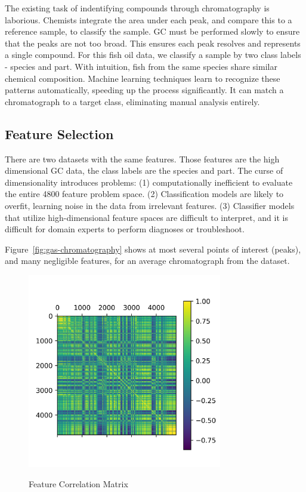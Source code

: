 \documentclass[runningheads]{llncs}
\begin{document}
The existing task \cite{eder1995gas,restek2018high} of indentifying compounds through chromatography is laborious.
Chemists integrate the area under each peak, and compare this to a reference sample, to classify the sample.
GC must be performed slowly to ensure that the peaks are not too broad.
This ensures each peak resolves and represents a single compound.
For this fish oil data, we classify a sample by two class labels - species and part. 
With intuition, fish from the same species share similar chemical composition.
Machine learning techniques learn to recognize these patterns automatically, speeding up the process significantly. 
It can match a chromatograph to a target class, eliminating manual analysis entirely. 

\subsection{Feature Selection}
\label{sec:background-feature-selection}


There are two datasets with the same features. 
Those features are the high dimensional GC data, the class labels are the species and part.
The curse of dimensionality \cite{koppen2000curse} introduces problems: (1) computationally inefficient to evaluate the entire 4800 feature problem space. (2) Classification models are likely to overfit, learning noise in the data from irrelevant features. (3) Classifier models that utilize high-dimensional feature spaces are difficult to interpret, and it is difficult for domain experts to perform diagnoses or troubleshoot.

Figure~\ref{fig:gas-chromatography} shows at most several points of interest (peaks), and many negligible features, for an average chromatograph from the dataset. 

\begin{figure}[htb]
  \centering
  \caption{Feature Correlation Matrix}
  \includegraphics[width=8.5cm]{fish_correlation_matrix.png}
  \label{fig:correlation-matrix} 
  \captionsetup[figure]{font=small,labelfont=small}
\end{figure}
\end{document}
